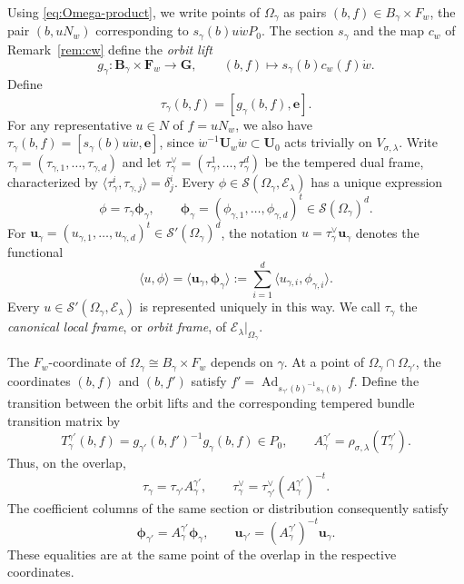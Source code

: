 \documentclass[a4paper,12pt]{amsart}
\numberwithin{equation}{section}
\theoremstyle{definition}
\theoremstyle{remark}
\newcommand{\G}{\mathbf G}
\newcommand{\U}{\mathbf U}
\newcommand{\F}{\mathbf F}
\newcommand{\B}{\mathbf B}
\newcommand{\mcS}{\mathcal S}
\newcommand{\mcE}{\mathcal E}
\newcommand{\Ad}{\operatorname{Ad}}
\begin{document}
Using \eqref{eq:Omega-product}, we write points of $\Omega_\gamma$ as pairs $(b,f)\in B_\gamma\times F_w$, the pair $(b,uN_w)$ corresponding to $s_\gamma(b)u\dot wP_0$. The section $s_\gamma$ and the map $c_w$ of Remark~\ref{rem:cw} define the \emph{orbit lift}
\[
 g_\gamma:\B_\gamma\times\F_w\to\G,\qquad(b,f)\mapsto s_\gamma(b)c_w(f)\dot w.
\]
Define
\begin{equation}\label{eq:tau-frame}
 \tau_\gamma(b,f)=[g_\gamma(b,f),\mathbf e].
\end{equation}
For any representative $u\in N$ of $f=uN_w$, we also have $\tau_\gamma(b,f)=[s_\gamma(b)u\dot w,\mathbf e]$, since $\dot w^{-1}\U_w\dot w\subset\U_0$ acts trivially on $V_{\sigma,\lambda}$.
Write $\tau_\gamma=(\tau_{\gamma,1},\dots,\tau_{\gamma,d})$ and let $\tau_\gamma^\vee=(\tau_\gamma^1,\dots,\tau_\gamma^d)$ be the tempered dual frame, characterized by $\langle\tau_\gamma^i,\tau_{\gamma,j}\rangle=\delta^i_j$. Every $\phi\in\mcS(\Omega_\gamma,\mcE_\lambda)$ has a unique expression
\[
 \phi=\tau_\gamma\boldsymbol\phi_\gamma,\qquad
 \boldsymbol\phi_\gamma=(\phi_{\gamma,1},\dots,\phi_{\gamma,d})^t\in\mcS(\Omega_\gamma)^d.
\]
For $\mathbf u_\gamma=(u_{\gamma,1},\dots,u_{\gamma,d})^t\in\mcS'(\Omega_\gamma)^d$, the notation $u=\tau_\gamma^\vee\mathbf u_\gamma$ denotes the functional
\[
 \langle u,\phi\rangle=\langle\mathbf u_\gamma,\boldsymbol\phi_\gamma\rangle
 :=\sum_{i=1}^d\langle u_{\gamma,i},\phi_{\gamma,i}\rangle.
\]
Every $u\in\mcS'(\Omega_\gamma,\mcE_\lambda)$ is represented uniquely in this way. We call $\tau_\gamma$ the \emph{canonical local frame}, or \emph{orbit frame}, of $\mcE_\lambda|_{\Omega_\gamma}$.

The $F_w$-coordinate of $\Omega_\gamma\cong B_\gamma\times F_w$ depends on $\gamma$. At a point of $\Omega_\gamma\cap\Omega_{\gamma'}$, the coordinates $(b,f)$ and $(b,f')$ satisfy $f'=\Ad_{s_{\gamma'}(b)^{-1}s_\gamma(b)}f$. Define the transition between the orbit lifts and the corresponding tempered bundle transition matrix by
\[
 T_\gamma^{\gamma'}(b,f)=g_{\gamma'}(b,f')^{-1}g_\gamma(b,f)\in P_0,\qquad
 A_\gamma^{\gamma'}=\rho_{\sigma,\lambda}(T_\gamma^{\gamma'}).
\]
Thus, on the overlap,
\begin{equation}\label{eq:tau-transition}
 \tau_\gamma=\tau_{\gamma'}A_\gamma^{\gamma'},\qquad
 \tau_\gamma^\vee=\tau_{\gamma'}^\vee(A_\gamma^{\gamma'})^{-t}.
\end{equation}
The coefficient columns of the same section or distribution consequently satisfy
\[
 \boldsymbol\phi_{\gamma'}=A_\gamma^{\gamma'}\boldsymbol\phi_\gamma,\qquad
 \mathbf u_{\gamma'}=(A_\gamma^{\gamma'})^{-t}\mathbf u_\gamma.
\]
These equalities are at the same point of the overlap in the respective coordinates.
\end{document}

